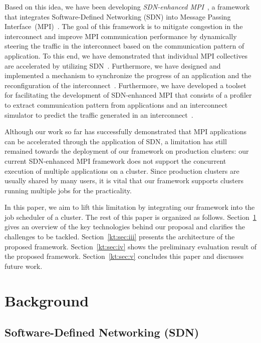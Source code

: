 \documentclass[graybox]{svmult}
\begin{document}
Based on this idea, we have been developing \textit{SDN-enhanced
MPI}~\cite{Date2016}, a framework that integrates Software-Defined Networking
(SDN) into Message Passing Interface~(MPI)~\cite{MPIForum2012}. The goal of
this framework is to mitigate congestion in the interconnect and improve MPI
communication performance by dynamically steering the traffic in the
interconnect based on the communication pattern of application. To this end,
we have demonstrated that individual MPI collectives are accelerated by
utilizing SDN~\cite{Dashdavaa2014,Takahashi2014}. Furthermore, we have
designed and implemented a mechanism to synchronize the progress of an
application and the reconfiguration of the
interconnect~\cite{Takahashi2015,Takahashi2018}. Furthermore, we have
developed a toolset for facilitating the development of SDN-enhanced MPI that
consists of a profiler to extract communication pattern from applications and
an interconnect simulator to predict the traffic generated in an
interconnect~\cite{Takahashi2017}.

Although our work so far has successfully demonstrated that MPI applications
can be accelerated through the application of SDN, a limitation has still
remained towards the deployment of our framework on production clusters: our
current SDN-enhanced MPI framework does not support the concurrent execution
of multiple applications on a cluster. Since production clusters are usually
shared by many users, it is vital that our framework supports clusters running
multiple jobs for the practicality.

In this paper, we aim to lift this limitation by integrating our framework
into the job scheduler of a cluster. The rest of this paper is organized as
follows. Section~\ref{kt:sec:ii} gives an overview of the key technologies
behind our proposal and clarifies the challenges to be tackled.
Section~\ref{kt:sec:iii} presents the architecture of the proposed framework.
Section~\ref{kt:sec:iv} shows the preliminary evaluation result of the
proposed framework. Section~\ref{kt:sec:v} concludes this paper and discusses
future work.

\section{Background}\label{kt:sec:ii}

\subsection{Software-Defined Networking (SDN)}
\end{document}
